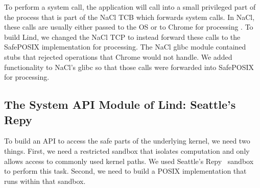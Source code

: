 To perform a system call, the application will call into a small privileged
part of the process that is part of the NaCl TCB which forwards system calls.
 In NaCl, these calls are usually either passed to the OS or to Chrome for 
processing .  To build Lind, we changed the NaCl TCP to 
instead forward these calls to the SafePOSIX implementation
for processing.  The NaCl glibc module contained stubs that rejected operations
that Chrome would not handle.  We added functionality to NaCl's glibc so that
those calls were forwarded into SafePOSIX for processing.


%

\subsection{The System API Module of Lind: Seattle's Repy}

To build an API to access the safe parts of the underlying kernel, we need 
two things.  First, we need a restricted sandbox that isolates computation
and only allows access to commonly used kernel paths.  We used 
Seattle's Repy~\cite{Repy-10} sandbox to perform this task.
Second, we need to build a POSIX implementation that runs within that sandbox.  


